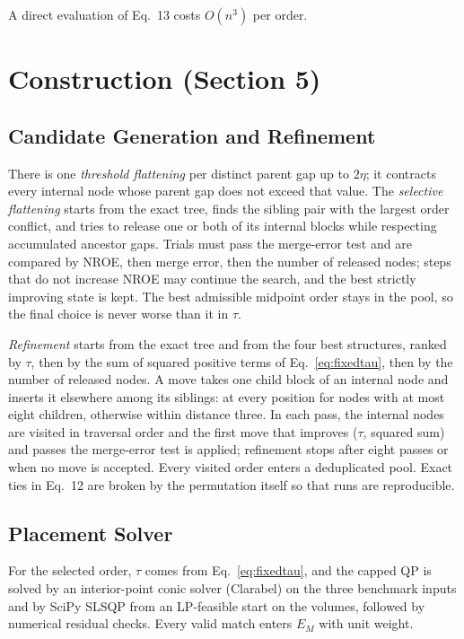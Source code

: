\documentclass[preprint]{vgtc}
\begin{document}
A direct evaluation of Eq.~13 costs $O(n^3)$ per order.

\section{Construction (Section 5)}\label{sec:construction}
\subsection{Candidate Generation and Refinement}
There is one \emph{threshold flattening} per distinct parent gap up to $2\eta$; it contracts every internal node whose parent gap does not exceed that value. The \emph{selective flattening} starts from the exact tree, finds the sibling pair with the largest order conflict, and tries to release one or both of its internal blocks while respecting accumulated ancestor gaps. Trials must pass the merge-error test and are compared by NROE, then merge error, then the number of released nodes; steps that do not increase NROE may continue the search, and the best strictly improving state is kept. The best admissible midpoint order stays in the pool, so the final choice is never worse than it in $\tau$.

\emph{Refinement} starts from the exact tree and from the four best structures, ranked by $\tau$, then by the sum of squared positive terms of Eq.~\ref{eq:fixedtau}, then by the number of released nodes. A move takes one child block of an internal node and inserts it elsewhere among its siblings: at every position for nodes with at most eight children, otherwise within distance three. In each pass, the internal nodes are visited in traversal order and the first move that improves ($\tau$, squared sum) and passes the merge-error test is applied; refinement stops after eight passes or when no move is accepted. Every visited order enters a deduplicated pool. Exact ties in Eq.~12 are broken by the permutation itself so that runs are reproducible.

\subsection{Placement Solver}
For the selected order, $\tau$ comes from Eq.~\ref{eq:fixedtau}, and the capped QP is solved by an interior-point conic solver (Clarabel) on the three benchmark inputs and by SciPy SLSQP from an LP-feasible start on the volumes, followed by numerical residual checks. Every valid match enters $E_M$ with unit weight.
\end{document}
